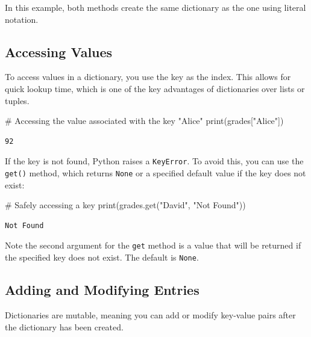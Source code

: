 \documentclass[
  letterpaper,
  DIV=11,
  numbers=noendperiod]{scrreprt}
\newenvironment{Shaded}{\begin{snugshade}}{\end{snugshade}}
\newcommand{\BuiltInTok}[1]{\textcolor[rgb]{0.00,0.23,0.31}{#1}}
\newcommand{\CommentTok}[1]{\textcolor[rgb]{0.37,0.37,0.37}{#1}}
\newcommand{\NormalTok}[1]{\textcolor[rgb]{0.00,0.23,0.31}{#1}}
\newcommand{\StringTok}[1]{\textcolor[rgb]{0.13,0.47,0.30}{#1}}
\begin{document}
In this example, both methods create the same dictionary as the one
using literal notation.

\hypertarget{accessing-values}{%
\subsection{Accessing Values}\label{accessing-values}}

To access values in a dictionary, you use the key as the index. This
allows for quick lookup time, which is one of the key advantages of
dictionaries over lists or tuples.

\begin{Shaded}
\begin{Highlighting}[]
\CommentTok{\# Accessing the value associated with the key "Alice"}
\BuiltInTok{print}\NormalTok{(grades[}\StringTok{"Alice"}\NormalTok{])  }
\end{Highlighting}
\end{Shaded}

\begin{verbatim}
92
\end{verbatim}

If the key is not found, Python raises a \texttt{KeyError}. To avoid
this, you can use the \texttt{get()} method, which returns \texttt{None}
or a specified default value if the key does not exist:

\begin{Shaded}
\begin{Highlighting}[]
\CommentTok{\# Safely accessing a key}
\BuiltInTok{print}\NormalTok{(grades.get(}\StringTok{"David"}\NormalTok{, }\StringTok{"Not Found"}\NormalTok{)) }
\end{Highlighting}
\end{Shaded}

\begin{verbatim}
Not Found
\end{verbatim}

Note the second argument for the \texttt{get} method is a value that
will be returned if the specified key does not exist. The default is
\texttt{None}.

\hypertarget{adding-and-modifying-entries}{%
\subsection{Adding and Modifying
Entries}\label{adding-and-modifying-entries}}

Dictionaries are mutable, meaning you can add or modify key-value pairs
after the dictionary has been created.
\end{document}
